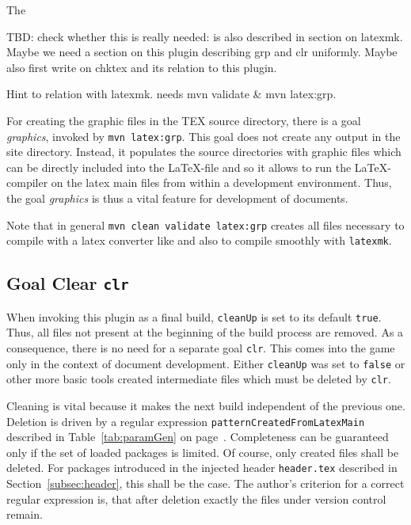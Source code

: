 The 

TBD\@: check whether this is really needed: is also described in section on latexmk. 
Maybe we need a section on this plugin describing grp and clr uniformly. 
Maybe also first write on chktex and its relation to this plugin. 

Hint to relation with latexmk. 
needs mvn validate \& mvn latex:grp. 

For creating the graphic files in the TEX source directory, 
there is a goal \emph{graphics}, invoked by \texttt{mvn latex:grp}. 
This goal does not create any output in the site directory. 
Instead, it populates the source directories 
with graphic files which can be directly included into the \LaTeX-file 
and so it allows to run the \LaTeX-compiler on the latex main files 
from within a development environment. 
Thus, the goal \emph{graphics} is thus a vital feature 
for development of documents. 


Note that in general \texttt{mvn clean validate latex:grp} 
creates all files necessary to compile with a latex converter like \lualatex{} 
and also to compile smoothly with \texttt{latexmk}. 



\subsection{Goal Clear \texttt{clr}}\label{subsec:develClear}

When invoking this plugin as a final build, 
\texttt{cleanUp} is set to its default \texttt{true}. 
Thus, all files not present at the beginning of the build process are removed. 
As a consequence, there is no need for a separate goal \texttt{clr}. 
This comes into the game only in the context of document development. 
Either \texttt{cleanUp} was set to \texttt{false} 
or other more basic tools created intermediate files which must be deleted by \texttt{clr}. 

Cleaning is vital because it makes the next build independent of the previous one. 
Deletion is driven by a regular expression \texttt{patternCreatedFromLatexMain} 
described in Table~\ref{tab:paramGen} on page~\pageref{tab:paramGen}. 
Completeness can be guaranteed only 
if the set of loaded packages is limited. 
Of course, only created files shall be deleted. 
For packages introduced in the injected header \texttt{header.tex} 
described in Section~\ref{subsec:header}, this shall be the case. 
The author's criterion for a correct regular expression is, 
that after deletion exactly the files under version control remain. 

